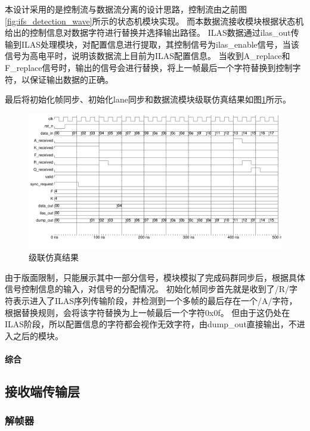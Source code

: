 \documentclass[UTF8]{ctexart}
\begin{document}
本设计采用的是控制流与数据流分离的设计思路，控制流由之前图\ref{fig:ifs_detection_wave}所示的状态机模块实现。
而本数据流接收模块根据状态机给出的控制信息对数据字符进行替换并选择输出路径。
ILAS数据通过ilas\_out传输到ILAS处理模块，对配置信息进行提取，其控制信号为ilas\_enable信号，当该信号为高电平时，说明该数据流上目前为ILAS配置信息。
当收到A\_replace和F\_replace信号时，输出的信号会进行替换，将上一帧最后一个字符替换到控制字符，以保证输出数据的正确。

最后将初始化帧同步、初始化lane同步和数据流模块级联仿真结果如图\ref{fig:recv_top_wave}所示。

\begin{figure}[H]
	\centering
	\includegraphics[width=18cm]{./img/recv_top_wave.pdf}
	\caption{级联仿真结果}
	\label{fig:recv_top_wave}
\end{figure}

由于版面限制，只能展示其中一部分信号，模块模拟了完成码群同步后，根据具体信号控制信息的输入，对信号的分配情况。
初始化帧同步首先就是收到了/R/字符表示进入了ILAS序列传输阶段，并检测到一个多帧的最后存在一个/A/字符，根据替换规则，会将该字符替换为上一帧最后一个字符0x0f。
但由于这仍处在ILAS阶段，所以配置信息的字符都会视作无效字符，由dump\_out直接输出，不进入之后的模块。

\paragraph{综合}

\subsection{接收端传输层}

\subsubsection{解帧器}


\end{document}
